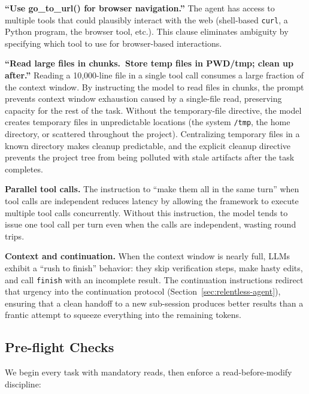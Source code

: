 \documentclass{article}
\begin{document}
\textbf{``Use go\_to\_url() for browser navigation.''}  The agent has access to multiple tools that could plausibly interact with the web (shell-based \texttt{curl}, a Python program, the browser tool, etc.).  This clause eliminates ambiguity by specifying which tool to use for browser-based interactions.

\textbf{``Read large files in chunks.\ Store temp files in PWD/tmp; clean up after.''}  Reading a 10,000-line file in a single tool call consumes a large fraction of the context window.  By instructing the model to read files in chunks, the prompt prevents context window exhaustion caused by a single-file read, preserving capacity for the rest of the task.  Without the temporary-file directive, the model creates temporary files in unpredictable locations (the system \texttt{/tmp}, the home directory, or scattered throughout the project).  Centralizing temporary files in a known directory makes cleanup predictable, and the explicit cleanup directive prevents the project tree from being polluted with stale artifacts after the task completes.

\textbf{Parallel tool calls.}  The instruction to ``make them all in the same turn'' when tool calls are independent reduces latency by allowing the framework to execute multiple tool calls concurrently.  Without this instruction, the model tends to issue one tool call per turn even when the calls are independent, wasting round trips.

\textbf{Context and continuation.}  When the context window is nearly full, LLMs exhibit a ``rush to finish'' behavior: they skip verification steps, make hasty edits, and call \texttt{finish} with an incomplete result.  The continuation instructions redirect that urgency into the continuation protocol (Section~\ref{sec:relentless-agent}), ensuring that a clean handoff to a new sub-session produces better results than a frantic attempt to squeeze everything into the remaining tokens.

\subsection{Pre-flight Checks}

We begin every task with mandatory reads, then enforce a read-before-modify discipline:
\end{document}
